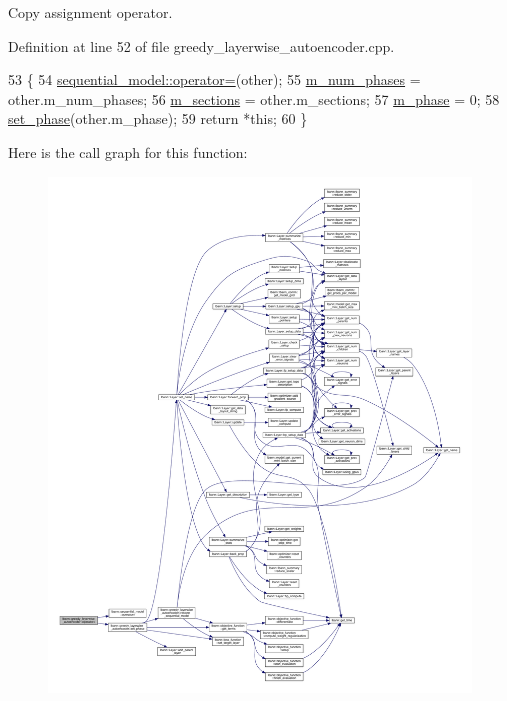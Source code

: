 Copy assignment operator. 

Definition at line 52 of file greedy\+\_\+layerwise\+\_\+autoencoder.\+cpp.


\begin{DoxyCode}
53                                              \{
54   \hyperlink{classlbann_1_1sequential__model_a9714c99522b90488c486b390c5a7b6f3}{sequential\_model::operator=}(other);
55   \hyperlink{classlbann_1_1greedy__layerwise__autoencoder_a792010a00136ee1e024b6e5d38c77386}{m\_num\_phases} = other.m\_num\_phases;
56   \hyperlink{classlbann_1_1greedy__layerwise__autoencoder_aacb3dbf01c38f46a32927722420c5d41}{m\_sections} = other.m\_sections;
57   \hyperlink{classlbann_1_1greedy__layerwise__autoencoder_a1baf1b5e7fdb5d006f443edbb0bb2973}{m\_phase} = 0;
58   \hyperlink{classlbann_1_1greedy__layerwise__autoencoder_a5f237f1f6285475c5493a7d15dc32096}{set\_phase}(other.m\_phase);
59   \textcolor{keywordflow}{return} *\textcolor{keyword}{this};
60 \}
\end{DoxyCode}
Here is the call graph for this function\+:\nopagebreak
\begin{figure}[H]
\begin{center}
\leavevmode
\includegraphics[width=350pt]{classlbann_1_1greedy__layerwise__autoencoder_ac5e2de693353966b7816ca10282068f5_cgraph}
\end{center}
\end{figure}
\mbox{\label{classlbann_1_1greedy__layerwise__autoencoder_a82b8ced756904a2423a65cd0e329b4e2}} 

